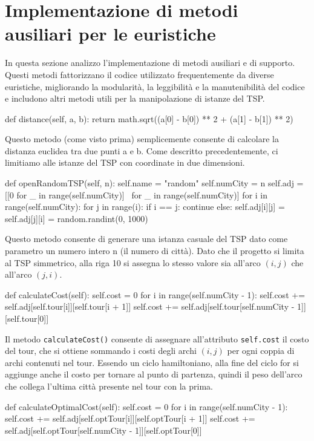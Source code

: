 \documentclass[a4paper,12pt]{report}
\begin{document}
\section{Implementazione di metodi ausiliari per le euristiche}
In questa sezione analizzo l'implementazione di metodi ausiliari e di supporto. Questi metodi fattorizzano il codice utilizzato frequentemente da diverse euristiche, migliorando la modularità, la leggibilità e la manutenibilità del codice e includono altri metodi utili per la manipolazione di istanze del TSP. \newline
\begin{python}
  def distance(self, a, b):
    return math.sqrt((a[0] - b[0]) ** 2 + (a[1] - b[1]) ** 2)
\end{python}
Questo metodo (come visto prima) semplicemente consente di calcolare la distanza euclidea tra due punti a e b. Come descritto precedentemente, ci limitiamo alle istanze del TSP con coordinate in due dimensioni.
\begin{python}
def openRandomTSP(self, n):
  self.name = "random"
  self.numCity = n
  self.adj = [[0 for _ in range(self.numCity)] \
                 for _ in range(self.numCity)]
  for i in range(self.numCity):
    for j in range(i):
      if i == j:
        continue
      else:
        self.adj[i][j] = self.adj[j][i] = random.randint(0, 1000)
\end{python}
Questo metodo consente di generare una istanza casuale del TSP dato come parametro un numero intero n (il numero di città). Dato che il progetto si limita al TSP simmetrico, alla riga 10 si assegna lo stesso valore sia all'arco $(i, j)$ che all'arco $(j, i)$.
\begin{python}
def calculateCost(self):
  self.cost = 0
  for i in range(self.numCity - 1):
    self.cost += self.adj[self.tour[i]][self.tour[i + 1]]
  self.cost += self.adj[self.tour[self.numCity - 1]][self.tour[0]]
\end{python}
Il metodo \lstinline!calculateCost()! consente di assegnare all'attributo \lstinline!self.cost! il costo del tour, che si ottiene sommando i costi degli archi $(i, j)$ per ogni coppia di archi contenuti nel tour. Essendo un ciclo hamiltoniano, alla fine del ciclo for si aggiunge anche il costo per tornare al punto di partenza, quindi il peso dell'arco che collega l'ultima città presente nel tour con la prima.
\begin{python}
def calculateOptimalCost(self):
  self.cost = 0
  for i in range(self.numCity - 1):
    self.cost += self.adj[self.optTour[i]][self.optTour[i + 1]]
  self.cost += self.adj[self.optTour[self.numCity - 1]][self.optTour[0]]
\end{python}
\end{document}
